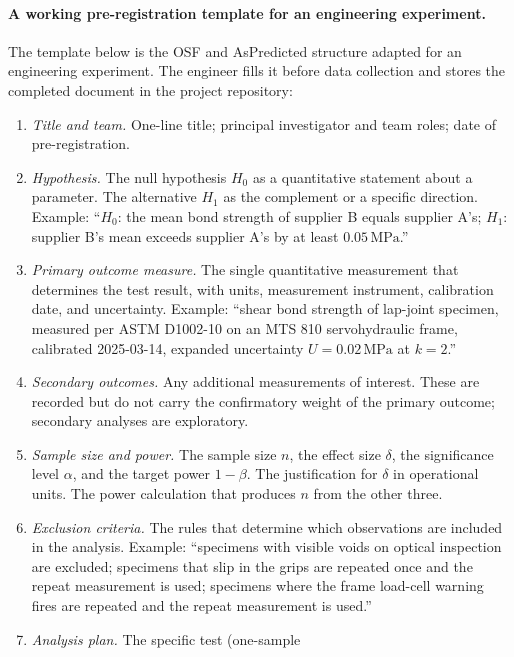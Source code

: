 \paragraph{A working pre-registration template for an engineering
experiment.}
The template below is the OSF and AsPredicted structure adapted
for an engineering experiment. The engineer fills it before data
collection and stores the completed document in the project
repository:

\begin{enumerate}[leftmargin=*]
  \item \textit{Title and team.} One-line title; principal
    investigator and team roles; date of pre-registration.
  \item \textit{Hypothesis.} The null hypothesis $H_{0}$ as a
    quantitative statement about a parameter. The alternative
    $H_{1}$ as the complement or a specific direction. Example:
    ``$H_{0}$: the mean bond strength of supplier B equals
    supplier A's; $H_{1}$: supplier B's mean exceeds supplier A's
    by at least $0.05\,\si{\mega\pascal}$.''
  \item \textit{Primary outcome measure.} The single quantitative
    measurement that determines the test result, with units,
    measurement instrument, calibration date, and uncertainty.
    Example: ``shear bond strength of lap-joint specimen,
    measured per ASTM D1002-10 on an MTS 810 servohydraulic
    frame, calibrated 2025-03-14, expanded uncertainty
    $U = 0.02\,\si{\mega\pascal}$ at $k = 2$.''
  \item \textit{Secondary outcomes.} Any additional measurements
    of interest. These are recorded but do not carry the
    confirmatory weight of the primary outcome; secondary
    analyses are exploratory.
  \item \textit{Sample size and power.} The sample size $n$, the
    effect size $\delta$, the significance level $\alpha$, and
    the target power $1 - \beta$. The justification for $\delta$
    in operational units. The power calculation that produces
    $n$ from the other three.
  \item \textit{Exclusion criteria.} The rules that determine
    which observations are included in the analysis. Example:
    ``specimens with visible voids on optical inspection are
    excluded; specimens that slip in the grips are repeated
    once and the repeat measurement is used; specimens where
    the frame load-cell warning fires are repeated and the
    repeat measurement is used.''
  \item \textit{Analysis plan.} The specific test (one-sample

\end{enumerate}
